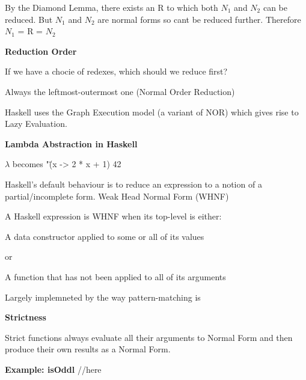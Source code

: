 \documentclass{article}
\begin{document}
By the Diamond Lemma, there exists an R to which both $N_1$ and $N_2$ can be reduced.
But $N_1$ and $N_2$ are normal forms so cant be reduced further. Therefore $N_1$ = R = $N_2$



\textbf{Reduction Order}

If we have a chocie of redexes, which should we reduce first?

Always the leftmost-outermost one (Normal Order Reduction)

Haskell uses the Graph Execution model (a variant of NOR) which gives rise to Lazy Evaluation.



\textbf{Lambda Abstraction in Haskell}

$\lambda$ becomes "\"
(x -> 2 * x + 1) 42


Haskell's default behaviour is to reduce an expression to a notion of a partial/incomplete form. Weak Head Normal Form (WHNF)

A Haskell expression is WHNF when its top-level is either:

A data constructor applied to some or all of its values

or

A function that has not been applied to all of its arguments

Largely implemneted by the way pattern-matching is

\textbf{Strictness}

Strict functions always evaluate all their arguments to Normal Form and then produce their own results as a Normal Form.


\textbf{Example: isOddl}
//here
\end{document}
